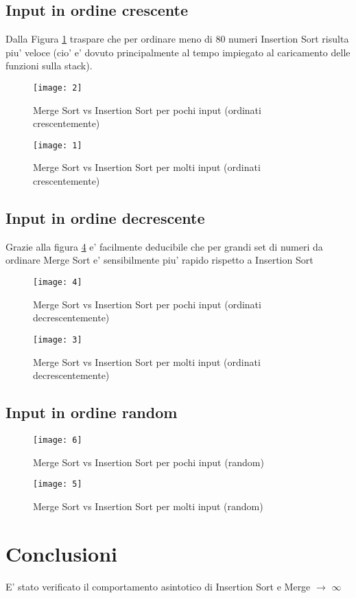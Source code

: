 \documentclass[a4paper]{article}
\begin{document}
\subsection{Input in ordine crescente}
Dalla Figura \ref{fig:SmallInsMergeCresc} traspare che per ordinare meno di 80 numeri Insertion Sort risulta piu' veloce (cio' e' dovuto principalmente al tempo impiegato al caricamento delle funzioni sulla stack).	

 
		\begin{figure}[!htb]
		\centering
		\texttt{[image: 2]}
		\caption{Merge Sort vs Insertion Sort per pochi input (ordinati crescentemente)}
		\label{fig:SmallInsMergeCresc}
		\end{figure}
		
		\begin{figure}[!htb]
		\centering
		\texttt{[image: 1]}
		\caption{Merge Sort vs Insertion Sort per molti input (ordinati crescentemente)}
		\label{fig:BigInsMergeCresc}
		\end{figure}
		

\newpage		
\subsection{Input in ordine decrescente}
Grazie alla figura \ref{fig:BigInsMergeDecr} e' facilmente deducibile che per grandi set di numeri da ordinare Merge Sort  e' sensibilmente piu' rapido rispetto a Insertion Sort 
 
		\begin{figure}[!htb]
		\centering
		\texttt{[image: 4]}
		\caption{Merge Sort vs Insertion Sort per pochi input (ordinati decrescentemente)}
		\label{fig:SmallInsMergeDecr}
		\end{figure}
		
		\begin{figure}[!htb]
		\centering
		\texttt{[image: 3]}
		\caption{Merge Sort vs Insertion Sort per molti input (ordinati decrescentemente)}
		\label{fig:BigInsMergeDecr}
		\end{figure}
\newpage		
\subsection{Input in ordine random}		

		\begin{figure}[!htb]
		\centering
		\texttt{[image: 6]}
		\caption{Merge Sort vs Insertion Sort per pochi input (random)}
		\label{fig:SmallInsMergeRandom}
		\end{figure}
		
		\begin{figure}[!htb]
		\centering
		\texttt{[image: 5]}
		\caption{Merge Sort vs Insertion Sort per molti input (random)}
		\label{fig:BigInsMergeRandom}
		\end{figure}
		

\section{Conclusioni}
E' stato verificato il comportamento asintotico di Insertion Sort e Merge $\longrightarrow$  \(\infty\)
\end{document}
